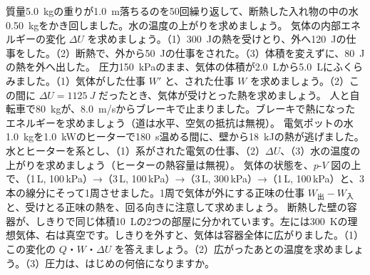 \bkendproblems
{}
\bkproblem 質量\qty{5.0}{kg}の重りが\qty{1.0}{m}落ちるのを50回繰り返して、断熱した入れ物の中の水\qty{0.50}{kg}をかき回しました。水の温度の上がりを求めましょう。
\bkproblem 気体の内部エネルギーの変化 $\Delta U$ を求めましょう。（1）\qty{300}{J}の熱を受けとり、外へ\qty{120}{J}の仕事をした。（2）断熱で、外から\qty{50}{J}の仕事をされた。（3）体積を変えずに、\qty{80}{J}の熱を外へ出した。
\bkproblem 圧力\qty{150}{kPa}のまま、気体の体積が\qty{2.0}{L}から\qty{5.0}{L}にふくらみました。（1）気体がした仕事 $W'$ と、された仕事 $W$ を求めましょう。（2）この間に $\Delta U=\qty{1125}{J}$ だったとき、気体が受けとった熱を求めましょう。
\bkproblem 人と自転車で\qty{80}{kg}が、\qty{8.0}{m/s}からブレーキで止まりました。ブレーキで熱になったエネルギーを求めましょう（道は水平、空気の抵抗は無視）。
\bkproblem 電気ポットの水\qty{1.0}{kg}を\qty{1.0}{kW}のヒーターで\qty{180}{s}温める間に、壁から\qty{18}{kJ}の熱が逃げました。水とヒーターを系とし、（1）系がされた電気の仕事、（2）$\Delta U$、（3）水の温度の上がりを求めましょう（ヒーターの熱容量は無視）。
\bkproblem 気体の状態を、$p$-$V$ 図の上で、（1\,L, 100\,kPa）→（3\,L, 100\,kPa）→（3\,L, 300\,kPa）→（1\,L, 100\,kPa）と、3本の線分にそって1周させました。1周で気体が外にする正味の仕事 $W_{\text{出}}-W_{\text{入}}$ と、受けとる正味の熱を、回る向きに注意して求めましょう。
\bkproblem 断熱した壁の容器が、しきりで同じ体積\qty{10}{L}の2つの部屋に分かれています。左には\qty{300}{K}の理想気体、右は真空です。しきりを外すと、気体は容器全体に広がりました。（1）この変化の $Q$・$W$・$\Delta U$ を答えましょう。（2）広がったあとの温度を求めましょう。（3）圧力は、はじめの何倍になりますか。
